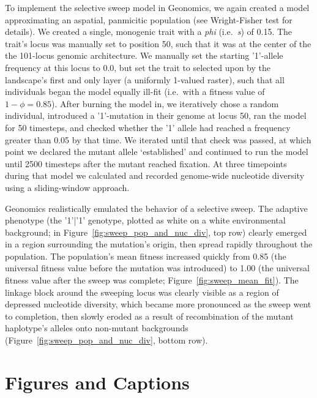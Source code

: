 ﻿\documentclass{article}
\begin{document}
To implement the selective sweep model in Geonomics, we again created a model
approximating an aspatial, panmicitic population (see Wright-Fisher test for details).
We created a single, monogenic trait with a \emph{phi} (i.e.\ \emph{s}) of 0.15.
The trait's locus was manually set to position 50,
such that it was at the center of the the 101-locus genomic architecture.
We manually set the starting '1'-allele frequency at this locus to 0.0,
but set the trait to selected upon by the landscape's first and only layer
(a uniformly 1-valued raster), such that all individuals began the model
equally ill-fit (i.e.\ with a fitness value of $1 - \phi = 0.85$).
After burning the model in, we iteratively chose a random individual,
introduced a '1'-mutation in their genome at locus 50, ran the model for 50 timesteps,
and checked whether the '1' allele had reached a frequency greater than 0.05 by that time.
We iterated until that check was passed, at which point we declared the mutant allele
`established' and continued to run the model until 2500 timesteps
after the mutant reached fixation.
At three timepoints during that model we calculated and recorded
genome-wide nucleotide diversity using a sliding-window approach.

Geonomics realistically emulated the behavior of a selective sweep.
The adaptive phenotype (the '1'|'1' genotype, plotted as white
on a white environmental background; in Figure~\ref{fig:sweep_pop_and_nuc_div}, top row)
clearly emerged in a region surrounding the mutation's origin,
then spread rapidly throughout the population.
The population's mean fitness increased quickly from 0.85
(the universal fitness value before the mutation was introduced) to 1.00
(the universal fitness value after the sweep was complete;
Figure~\ref{fig:sweep_mean_fit}).
The linkage block around the sweeping locus was clearly visible
as a region of depressed nucleotide diversity, which became more pronounced
as the sweep went to completion, then slowly eroded as a result of recombination
of the mutant haplotype's alleles onto non-mutant backgrounds
(Figure~\ref{fig:sweep_pop_and_nuc_div}, bottom row).









\pagebreak
\section{Figures and Captions}
\end{document}
